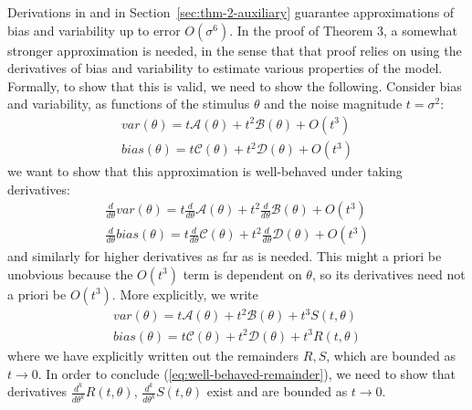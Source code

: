 Derivations in \citet{hahn2024unifying} and in Section~\ref{sec:thm-2-auxiliary} guarantee approximations of bias and variability up to error $O(\sigma^6)$.
In the proof of Theorem 3, a somewhat stronger approximation is needed, in the sense that that proof relies on using the derivatives of bias and variability to estimate various properties of the model.
Formally, to show that this is valid, we need to show the following.
Consider bias and variability, as functions of the stimulus $\theta$ and the noise magnitude $t = \sigma^2$:
    \begin{equation}
    \begin{aligned}
        var(\theta) = t \mathcal{A}(\theta) + t^2 \mathcal{B}(\theta) + O(t^3)\\
        bias(\theta) = t \mathcal{C}(\theta) + t^2 \mathcal{D}(\theta) + O(t^3) 
    \end{aligned}
    \end{equation}
    we want to show that this approximation is well-behaved under taking derivatives:
\begin{equation}\label{eq:well-behaved-remainder}
    \begin{aligned}
      \frac{d}{d\theta}  var(\theta) = t \frac{d}{d\theta}\mathcal{A}(\theta) + t^2 \frac{d}{d\theta}\mathcal{B}(\theta) + O(t^3)\\
      \frac{d}{d\theta}  bias(\theta) = t \frac{d}{d\theta}\mathcal{C}(\theta) + t^2 \frac{d}{d\theta}\mathcal{D}(\theta) + O(t^3) 
    \end{aligned}
    \end{equation}
    and similarly for higher derivatives as far as is needed.
    This might a priori be unobvious because the $O(t^3)$ term is dependent on $\theta$, so its derivatives need not a priori be $O(t^3)$.
    More explicitly, we write
    \begin{equation}
    \begin{aligned}
        var(\theta) = t \mathcal{A}(\theta) + t^2 \mathcal{B}(\theta) + t^3 S(t,\theta)\\
        bias(\theta) = t \mathcal{C}(\theta) + t^2 \mathcal{D}(\theta) + t^3 R(t,\theta) 
    \end{aligned}
    \end{equation}
    where we have explicitly written out the remainders $R, S$, which are bounded as $t\rightarrow 0$.
In order to conclude (\ref{eq:well-behaved-remainder}), we need to show that derivatives $\frac{d^k}{d\theta^k} R(t,\theta)$, $\frac{d^k}{d\theta^k} S(t,\theta)$ exist and are bounded as $t \rightarrow 0$.
